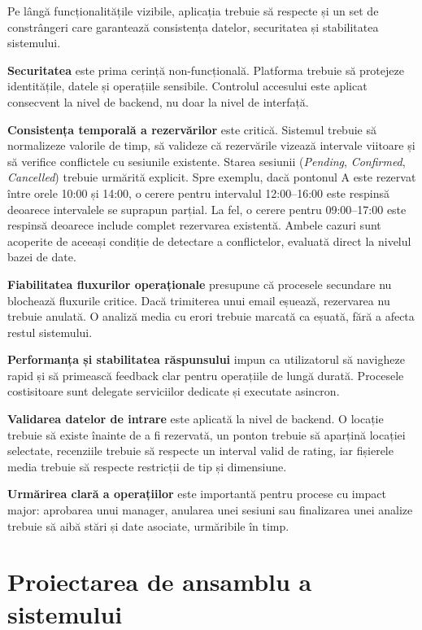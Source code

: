 Pe lângă funcționalitățile vizibile, aplicația trebuie să respecte și un set de constrângeri care garantează consistența datelor, securitatea și stabilitatea sistemului.

\textbf{Securitatea} este prima cerință non-funcțională. Platforma trebuie să protejeze identitățile, datele și operațiile sensibile. Controlul accesului este aplicat consecvent la nivel de backend, nu doar la nivel de interfață.

\textbf{Consistența temporală a rezervărilor} este critică. Sistemul trebuie să normalizeze valorile de timp, să valideze că rezervările vizează intervale viitoare și să verifice conflictele cu sesiunile existente. Starea sesiunii (\emph{Pending}, \emph{Confirmed}, \emph{Cancelled}) trebuie urmărită explicit. Spre exemplu, dacă pontonul A este rezervat între orele 10:00 și 14:00, o cerere pentru intervalul 12:00–16:00 este respinsă deoarece intervalele se suprapun parțial. La fel, o cerere pentru 09:00–17:00 este respinsă deoarece include complet rezervarea existentă. Ambele cazuri sunt acoperite de aceeași condiție de detectare a conflictelor, evaluată direct la nivelul bazei de date.

\textbf{Fiabilitatea fluxurilor operaționale} presupune că procesele secundare nu blochează fluxurile critice. Dacă trimiterea unui email eșuează, rezervarea nu trebuie anulată. O analiză media cu erori trebuie marcată ca eșuată, fără a afecta restul sistemului.

\textbf{Performanța și stabilitatea răspunsului} impun ca utilizatorul să navigheze rapid și să primească feedback clar pentru operațiile de lungă durată. Procesele costisitoare sunt delegate serviciilor dedicate și executate asincron.

\textbf{Validarea datelor de intrare} este aplicată la nivel de backend. O locație trebuie să existe înainte de a fi rezervată, un ponton trebuie să aparțină locației selectate, recenziile trebuie să respecte un interval valid de rating, iar fișierele media trebuie să respecte restricții de tip și dimensiune.

\textbf{Urmărirea clară a operațiilor} este importantă pentru procese cu impact major: aprobarea unui manager, anularea unei sesiuni sau finalizarea unei analize trebuie să aibă stări și date asociate, urmăribile în timp.

\section{Proiectarea de ansamblu a sistemului}


